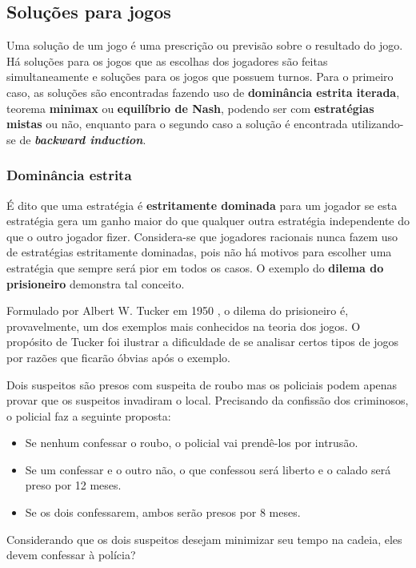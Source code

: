 \subsection{Soluções para jogos}
Uma solução de um jogo é uma prescrição ou previsão sobre o resultado do jogo. Há soluções para os jogos que as escolhas dos jogadores são feitas simultaneamente e soluções para os jogos que possuem turnos. Para o primeiro caso, as soluções são encontradas fazendo uso de \textbf{dominância estrita iterada}, teorema \textbf{minimax} ou \textbf{equilíbrio de Nash}, podendo ser com \textbf{estratégias mistas} ou não, enquanto para o segundo caso a solução é encontrada utilizando-se de \textbf{\emph{backward induction}}.

\subsubsection{Dominância estrita}

É dito que uma estratégia é {\bfseries estritamente dominada} para um jogador se esta estratégia gera um ganho maior do que qualquer outra estratégia independente do que o outro jogador fizer. Considera-se que jogadores racionais nunca fazem uso de estratégias estritamente dominadas, pois não há motivos para escolher uma estratégia que sempre será pior em todos os casos. O exemplo do {\bfseries dilema do prisioneiro} demonstra tal conceito.

Formulado por Albert W. Tucker em 1950 \cite{sartini_IIbienaldasbm}, o dilema do prisioneiro é, provavelmente, um dos exemplos mais conhecidos na teoria dos jogos. O propósito de Tucker foi ilustrar a dificuldade de se analisar certos tipos de jogos por razões que ficarão óbvias após o exemplo.


\begin{myex}\label{ex:dilema-do-prisioneiro}
Dois suspeitos são presos com suspeita de roubo mas os policiais podem apenas provar que os suspeitos invadiram o local. Precisando da confissão dos criminosos, o policial faz a seguinte proposta:
\begin{itemize}
	\tightlist
	\item Se nenhum confessar o roubo, o policial vai prendê-los por intrusão.
	\item Se um confessar e o outro não, o que confessou será liberto e o calado será preso por 12 meses.
	\item Se os dois confessarem, ambos serão presos por 8 meses.
\end{itemize}
Considerando que os dois suspeitos desejam minimizar seu tempo na cadeia, eles devem confessar à polícia?
\end{myex}

